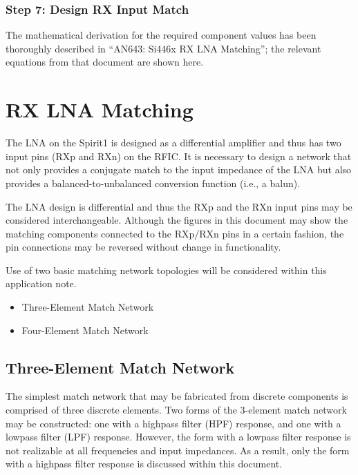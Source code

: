       \subsubsection{Step 7: Design RX Input Match}
        The mathematical derivation for the required component values has been thoroughly described 
        in “AN643: Si446x RX LNA Matching”; the relevant equations from that document are shown 
        here.
   
  \section{RX LNA Matching}
    The LNA on the Spirit1 is designed as a differential amplifier and thus has two input pins (RXp 
    and RXn) on the RFIC. It is necessary to design a network that not only provides a conjugate 
    match to the input impedance of the LNA but also provides a balanced-to-unbalanced conversion 
    function (i.e., a balun).
    
    The LNA design is differential and thus the RXp and the RXn input pins may be considered 
    interchangeable. Although the figures in this document may show the matching components 
    connected to the RXp/RXn pins in a certain fashion, the pin connections may be reversed without 
    change in functionality.
    
    Use of two basic matching network topologies will be considered within this application note.
    \begin{itemize}\addtolength{\itemsep}{-0.5\baselineskip}
      \item Three-Element Match Network
      \item Four-Element Match Network
    \end{itemize}
    
    \subsection{Three-Element Match Network}
      The simplest match network that may be fabricated from discrete components is comprised of 
      three discrete elements. Two forms of the 3-element match network may be constructed: one 
      with a highpass filter (HPF) response, and one with a lowpass filter (LPF) response. However, 
      the form with a lowpass filter response is not realizable at all frequencies and input 
      impedances. As a result, only the form with a highpass filter response is discussed within 
      this document.
      

